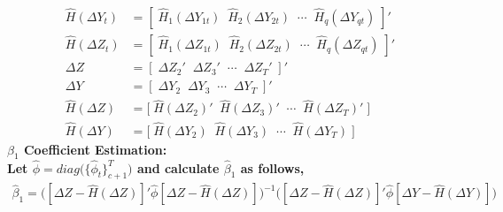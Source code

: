 \documentclass[10pt]{article}
\begin{document}
%
 \begin{align*} 
   \hat{H}(\Delta Y_t)  &= [ \; \hat{H}_1(\Delta Y_{1t}) \;\; \hat{H}_2(\Delta Y_{2t}) \;\; \cdots \;\; \hat{H}_q(\Delta Y_{qt}) \; ]'\\
%
\hat{H}(\Delta Z_t)  &= [ \; \hat{H}_1(\Delta Z_{1t}) \;\; \hat{H}_2(\Delta Z_{2t}) \;\; \cdots \;\; \hat{H}_q(\Delta Z_{qt}) \; ]'\\
%
\Delta Z &= [ \; \Delta Z_{2}' \;\; \Delta Z_{3}' \;\; \cdots \;\; \Delta Z_{T}' \;]' \\
%
 \Delta Y &= [ \; \Delta Y_{2} \;\; \Delta Y_{3} \;\; \cdots \;\; \Delta Y_{T} \;]' \\
%
\hat{H}(\Delta Z) &= \big[\; \hat{H}(\Delta Z_{2})' \;\; \hat{H}(\Delta Z_{3})' \;\;\cdots \;\; \hat{H}(\Delta Z_{T})' \; \big] \\
%
 \hat{H}(\Delta Y) &= \big[\; \hat{H}(\Delta Y_{2}) \;\; \hat{H}(\Delta Y_{3}) \;\;\cdots \;\; \hat{H}(\Delta Y_{T}) \; \big]
\end{align*}
%
\noindent \bf $\beta_1$ Coefficient Estimation:\rm \\
%
 Let $\hat{\phi} = diag\big( \{\hat{\phi}_t\}_{c+1}^T \big)$ and calculate $\hat{\beta}_1$ as follows,  
    \begin{align*} 
  \hat{\beta}_1 = \Big( [\Delta Z - \hat{H}(\Delta Z)]' \hat{\phi} [\Delta Z - \hat{H}(\Delta Z)] \Big)^{-1} \Big( [\Delta Z - \hat{H}(\Delta Z)]' \hat{\phi} [\Delta Y - \hat{H}(\Delta Y)] \Big)
    \end{align*}
\newpage
\end{document}
